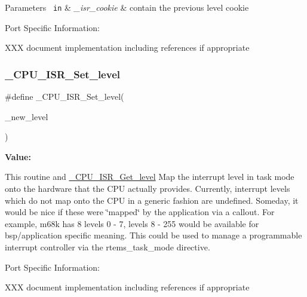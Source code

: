 \begin{DoxyParams}[1]{Parameters}
\mbox{\texttt{ in}}  & {\em \+\_\+isr\+\_\+cookie} & contain the previous level cookie\\
\hline
\end{DoxyParams}
Port Specific Information\+:

X\+XX document implementation including references if appropriate \mbox{\label{group__RTEMSScoreCPUBfinCPUInterrupt_ga0d657d03b719953545e72902cad21689}} 
\subsubsection{\texorpdfstring{\_CPU\_ISR\_Set\_level}{\_CPU\_ISR\_Set\_level}}
{\footnotesize\ttfamily \#define \+\_\+\+C\+P\+U\+\_\+\+I\+S\+R\+\_\+\+Set\+\_\+level(\begin{DoxyParamCaption}\item[{}]{\+\_\+new\+\_\+level }\end{DoxyParamCaption})}

{\bfseries Value\+:}
\begin{DoxyCode}{0}
\DoxyCodeLine{\{ \(\backslash\)}
\DoxyCodeLine{  \}}

\end{DoxyCode}
This routine and \mbox{\hyperlink{group__RTEMSScoreCPUARM_ga1d9dcab9170d532b6634a5620385adbd}{\+\_\+\+C\+P\+U\+\_\+\+I\+S\+R\+\_\+\+Get\+\_\+level}} Map the interrupt level in task mode onto the hardware that the C\+PU actually provides. Currently, interrupt levels which do not map onto the C\+PU in a generic fashion are undefined. Someday, it would be nice if these were \char`\"{}mapped\char`\"{} by the application via a callout. For example, m68k has 8 levels 0 -\/ 7, levels 8 -\/ 255 would be available for bsp/application specific meaning. This could be used to manage a programmable interrupt controller via the rtems\+\_\+task\+\_\+mode directive.

Port Specific Information\+:

X\+XX document implementation including references if appropriate 

